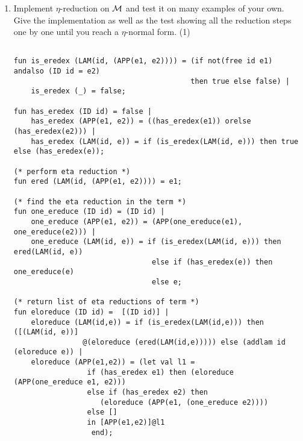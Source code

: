 \documentclass[11pt]{article}
\newcommand \cM {\cal M}
\begin{document}
\begin{enumerate}
\begin{itemize}
\begin{verbatim}
- credex ct2;
(K'' x)
0 steps
val it = () : unit

- credex ct3;
((I'' (K'' x)) z)-->
((K'' x) z)-->
x
2 steps
val it = () : unit

- credex ct4;
(I'' z)-->
z
1 steps
val it = () : unit

- credex ct5;
(((I'' (K'' x)) z) ((I'' (K'' x)) z))-->
(((K'' x) z) ((I'' (K'' x)) z))-->
(x ((I'' (K'' x)) z))-->
(x ((K'' x) z))-->
(x x)
4 steps
val it = () : unit

- credex ct6;
S''
0 steps
val it = () : unit

- credex ct7;
((S'' I'') I'')
0 steps
val it = () : unit

- credex ct8;
((S'' I'') I'')
0 steps
val it = () : unit

- credex ct9;
(((S'' I'') I'') ((I'' (K'' x)) z))-->
(((S'' I'') I'') ((K'' x) z))-->
(((S'' I'') I'') x)-->
((I'' x) (I'' x))-->
(x (I'' x))-->
(x x)
5 steps
val it = () : unit
	      	      \end{verbatim}
	      	      
	      \end{itemize}
	      \color{black}
	\item
	      Implement $\eta$-reduction on $\cM$ and test it on many examples of your own.
	      Give the implementation as well as the test showing all the reduction steps one by one until you reach a $\eta$-normal form. 
	      \hfill{(1)} %
	      
	      \color{red}
	      \begin{verbatim}

fun is_eredex (LAM(id, (APP(e1, e2)))) = (if not(free id e1) andalso (ID id = e2) 
                                         then true else false) |
    is_eredex (_) = false;

fun has_eredex (ID id) = false |
    has_eredex (APP(e1, e2)) = ((has_eredex(e1)) orelse (has_eredex(e2))) |
    has_eredex (LAM(id, e)) = if (is_eredex(LAM(id, e))) then true else (has_eredex(e));

(* perform eta reduction *)
fun ered (LAM(id, (APP(e1, e2)))) = e1;

(* find the eta reduction in the term *)
fun one_ereduce (ID id) = (ID id) |
    one_ereduce (APP(e1, e2)) = (APP(one_ereduce(e1), one_ereduce(e2))) |
    one_ereduce (LAM(id, e)) = if (is_eredex(LAM(id, e))) then ered(LAM(id, e)) 
								else if (has_eredex(e)) then one_ereduce(e)
								else e;

(* return list of eta reductions of term *)
fun eloreduce (ID id) =  [(ID id)] |
    eloreduce (LAM(id,e)) = if (is_eredex(LAM(id,e))) then ([(LAM(id, e))]
                @(eloreduce (ered(LAM(id,e))))) else (addlam id (eloreduce e)) |
    eloreduce (APP(e1,e2)) = (let val l1 = 
                 if (has_eredex e1) then (eloreduce (APP(one_ereduce e1, e2))) 
                 else if (has_eredex e2) then  
                    (eloreduce (APP(e1, (one_ereduce e2)))) 
                 else []
                 in [APP(e1,e2)]@l1
			      end);
			      

\end{verbatim}
\end{enumerate}
\end{document}
